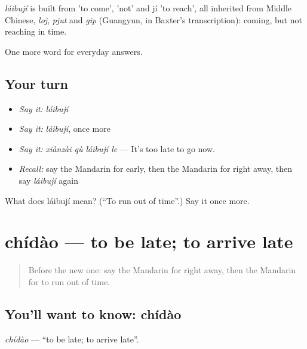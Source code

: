 \begin{cousinweb}
\emph{láibují} is built from  'to come',  'not' and jí 'to reach', all inherited from Middle Chinese, \emph{loj}, \emph{pjut} and \emph{gip} (Guangyun, in Baxter's transcription): coming, but not reaching in time.
\end{cousinweb}

\begin{grammarlens}[title={What you've built}]
One more word for everyday answers.
\end{grammarlens}

\subsection*{Your turn}
\begin{itemize}
\raggedright
  \item \emph{Say it:} \emph{láibují}
  \item \emph{Say it:} \emph{láibují}, once more
  \item \emph{Say it:} \emph{xiànzài qù láibují le} — It's too late to go now.
  \item \emph{Recall:} say the Mandarin for early, then the Mandarin for right away, then say \emph{láibují} again
\end{itemize}

\begin{tcolorbox}[breakable,colback=teal!4,colframe=teal!35!black,title={Before you move on}]
What does láibují mean? (\textquotedblleft{}To run out of time\textquotedblright{}.) Say it once more.
\end{tcolorbox}
\section[chídào]{chídào — to be late; to arrive late}

\label{lesson:ZH-C83-chidao}



\begin{quote}
Before the new one: say the Mandarin for right away, then the Mandarin for to run out of time.
\end{quote}

\subsection*{You'll want to know: chídào}
\emph{chídào} — \textquotedblleft{}to be late; to arrive late\textquotedblright{}.

